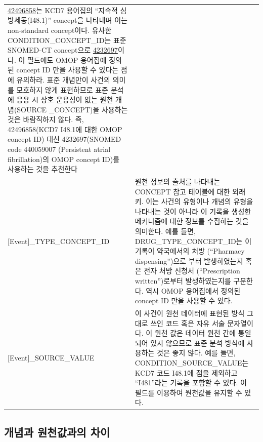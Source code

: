 \documentclass[10.5pt]{book}
\theoremstyle{definition}
\theoremstyle{definition}
\theoremstyle{definition}
\theoremstyle{remark}
\begin{document}
\begin{longtable}[]{@{}ll@{}}
\begin{minipage}[t]{0.60\columnwidth}
\href{http://athena.ohdsi.org/search-terms/terms/42488512}{42496858}는
KCD7 용어집의 ``지속적 심방세동(I48.1)'' concept을 나타내며 이는
non-standard concept이다. 유사한 CONDITION\_CONCEPT\_ID는 표준 SNOMED-CT
concept으로
\href{http://athena.ohdsi.org/search-terms/terms/4232697}{4232697}이다.
이 필드에도 OMOP 용어집에 정의된 concept ID 만을 사용할 수 있다는 점에
유의하라. 표준 개념만이 사건의 의미를 모호하지 않게 표현하므로 표준
분석에 응용 시 상호 운용성이 없는 원천 개념(SOURCE \_CONCEPT)을 사용하는
것은 바람직하지 않다. 즉, 42496858(KCD7 I48.1에 대한 OMOP concept ID)
대신 4232697(SNOMED code 440059007 (Persistent atrial fibrillation)의
OMOP concept ID)를 사용하는 것을 추천한다\strut
\end{minipage}\tabularnewline
\begin{minipage}[t]{0.34\columnwidth}\raggedright\strut
{[}Event{]}\_TYPE\_CONCEPT\_ID\strut
\end{minipage} & \begin{minipage}[t]{0.60\columnwidth}\raggedright\strut
원천 정보의 출처를 나타내는 CONCEPT 참고 테이블에 대한 외래 키. 이는
사건의 유형이나 개념의 유형을 나타내는 것이 아니라 이 기록을 생성한
메커니즘에 대한 정보를 수집하는 것을 의미한다. 예를 들면,
DRUG\_TYPE\_CONCEPT\_ID는 이 기록이 약국에서의 처방 (``Pharmacy
dispensing'')으로 부터 발생하였는지 혹은 전자 처방 신청서
(``Prescription written'')로부터 발생하였는지를 구분한다. 역시 OMOP
용어집에서 정의된 concept ID 만을 사용할 수 있다.\strut
\end{minipage}\tabularnewline
\begin{minipage}[t]{0.34\columnwidth}\raggedright\strut
{[}Event{]}\_SOURCE\_VALUE\strut
\end{minipage} & \begin{minipage}[t]{0.60\columnwidth}\raggedright\strut
이 사건이 원천 데이터에 표현된 방식 그대로 쓰인 코드 혹은 자유 서술
문자열이다. 이 원천 값은 데이터 원천 간에 통일되어 있지 않으므로 표준
분석 방식에 사용하는 것은 좋지 않다. 예를 들면,
CONDITION\_SOURCE\_VALUE는 KCD7 코드 I48.1에 점을 제외하고 ``I481''라는
기록을 포함할 수 있다. 이 필드를 이용하여 원천값을 유지할 수 있다.\strut
\end{minipage}\tabularnewline
\bottomrule
\end{longtable}

\subsection{개념과 원천값과의 차이}\label{concepts-Sources}
\end{document}
